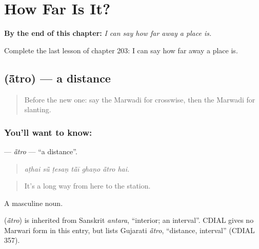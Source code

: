
\chapter{How Far Is It?}
\label{ch:mw-how-far-is-it}

\begin{chapteropening}
\textbf{By the end of this chapter:} \emph{I can say how far away a place is.}

Complete the last lesson of chapter 203: I can say how far away a place is.
\end{chapteropening}

\section[\texorpdfstring{\mw{आंतरो} (ā̃tro)}{आंतरो (ā̃tro)}]{ (ā̃tro) — a distance}

\label{lesson:MW-C203-atro}



\begin{quote}
Before the new one: say the Marwadi for crosswise, then the Marwadi for slanting.
\end{quote}

\subsection*{You'll want to know: }
\textbf{} — \emph{ā̃tro} — \textquotedblleft{}a distance\textquotedblright{}.

\begin{quote}
      
\end{quote}

\begin{quote}
\emph{aṭhai sū̃ ṭesaṇ tā̃ī ghaṇo ā̃tro hai.}
\end{quote}

\begin{quote}
It's a long way from here to the station.
\end{quote}

A masculine noun.

\begin{cousinweb}
\textbf{} (\emph{ā̃tro}) is inherited from Sanskrit \emph{antara}, \textquotedblleft{}interior; an interval\textquotedblright{}. CDIAL gives no Marwari form in this entry, but lists Gujarati \emph{ā̃tro}, \textquotedblleft{}distance, interval\textquotedblright{} (CDIAL 357).
\end{cousinweb}

